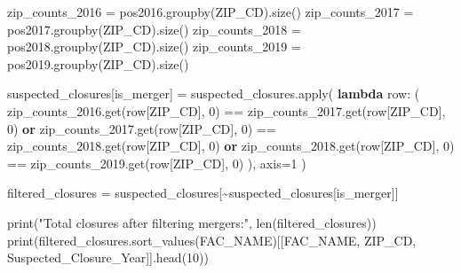 \documentclass[
  letterpaper,
  DIV=11,
  numbers=noendperiod]{scrartcl}
\newenvironment{Shaded}{\begin{snugshade}}{\end{snugshade}}
\newcommand{\BuiltInTok}[1]{\textcolor[rgb]{0.00,0.23,0.31}{#1}}
\newcommand{\DecValTok}[1]{\textcolor[rgb]{0.68,0.00,0.00}{#1}}
\newcommand{\KeywordTok}[1]{\textcolor[rgb]{0.00,0.23,0.31}{\textbf{#1}}}
\newcommand{\NormalTok}[1]{\textcolor[rgb]{0.00,0.23,0.31}{#1}}
\newcommand{\OperatorTok}[1]{\textcolor[rgb]{0.37,0.37,0.37}{#1}}
\newcommand{\StringTok}[1]{\textcolor[rgb]{0.13,0.47,0.30}{#1}}
\begin{document}
\begin{Shaded}
\begin{Highlighting}[]
\NormalTok{zip\_counts\_2016 }\OperatorTok{=}\NormalTok{ pos2016.groupby(}\StringTok{\textquotesingle{}ZIP\_CD\textquotesingle{}}\NormalTok{).size()}
\NormalTok{zip\_counts\_2017 }\OperatorTok{=}\NormalTok{ pos2017.groupby(}\StringTok{\textquotesingle{}ZIP\_CD\textquotesingle{}}\NormalTok{).size()}
\NormalTok{zip\_counts\_2018 }\OperatorTok{=}\NormalTok{ pos2018.groupby(}\StringTok{\textquotesingle{}ZIP\_CD\textquotesingle{}}\NormalTok{).size()}
\NormalTok{zip\_counts\_2019 }\OperatorTok{=}\NormalTok{ pos2019.groupby(}\StringTok{\textquotesingle{}ZIP\_CD\textquotesingle{}}\NormalTok{).size()}

\NormalTok{suspected\_closures[}\StringTok{\textquotesingle{}is\_merger\textquotesingle{}}\NormalTok{] }\OperatorTok{=}\NormalTok{ suspected\_closures.}\BuiltInTok{apply}\NormalTok{(}
    \KeywordTok{lambda}\NormalTok{ row: (}
\NormalTok{        zip\_counts\_2016.get(row[}\StringTok{\textquotesingle{}ZIP\_CD\textquotesingle{}}\NormalTok{], }\DecValTok{0}\NormalTok{) }\OperatorTok{==}\NormalTok{ zip\_counts\_2017.get(row[}\StringTok{\textquotesingle{}ZIP\_CD\textquotesingle{}}\NormalTok{], }\DecValTok{0}\NormalTok{) }\KeywordTok{or}
\NormalTok{        zip\_counts\_2017.get(row[}\StringTok{\textquotesingle{}ZIP\_CD\textquotesingle{}}\NormalTok{], }\DecValTok{0}\NormalTok{) }\OperatorTok{==}\NormalTok{ zip\_counts\_2018.get(row[}\StringTok{\textquotesingle{}ZIP\_CD\textquotesingle{}}\NormalTok{], }\DecValTok{0}\NormalTok{) }\KeywordTok{or}
\NormalTok{        zip\_counts\_2018.get(row[}\StringTok{\textquotesingle{}ZIP\_CD\textquotesingle{}}\NormalTok{], }\DecValTok{0}\NormalTok{) }\OperatorTok{==}\NormalTok{ zip\_counts\_2019.get(row[}\StringTok{\textquotesingle{}ZIP\_CD\textquotesingle{}}\NormalTok{], }\DecValTok{0}\NormalTok{)}
\NormalTok{    ), axis}\OperatorTok{=}\DecValTok{1}
\NormalTok{)}

\NormalTok{filtered\_closures }\OperatorTok{=}\NormalTok{ suspected\_closures[}\OperatorTok{\textasciitilde{}}\NormalTok{suspected\_closures[}\StringTok{\textquotesingle{}is\_merger\textquotesingle{}}\NormalTok{]]}

\BuiltInTok{print}\NormalTok{(}\StringTok{"Total closures after filtering mergers:"}\NormalTok{, }\BuiltInTok{len}\NormalTok{(filtered\_closures))}
\BuiltInTok{print}\NormalTok{(filtered\_closures.sort\_values(}\StringTok{\textquotesingle{}FAC\_NAME\textquotesingle{}}\NormalTok{)[[}\StringTok{\textquotesingle{}FAC\_NAME\textquotesingle{}}\NormalTok{, }\StringTok{\textquotesingle{}ZIP\_CD\textquotesingle{}}\NormalTok{, }\StringTok{\textquotesingle{}Suspected\_Closure\_Year\textquotesingle{}}\NormalTok{]].head(}\DecValTok{10}\NormalTok{))}
\end{Highlighting}
\end{Shaded}
\end{document}
